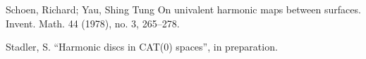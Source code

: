 \documentclass{article}
\begin{document}
\begin{thebibliography}{52}
 Schoen, Richard; Yau, Shing Tung
On univalent harmonic maps between surfaces.
Invent. Math. 44 (1978), no. 3, 265--278. 

 Stadler, S. ``Harmonic discs in CAT(0) spaces'', in preparation.



\end{thebibliography}
\end{document}
